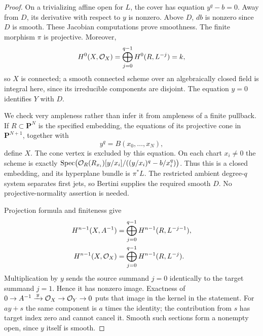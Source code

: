 \begin{proof}
On a trivializing affine open for $L$, the cover has equation
$y^q-b=0$. Away from $D$, its derivative with respect to $y$ is
nonzero. Above $D$, $db$ is nonzero since $D$ is smooth. These
Jacobian computations prove smoothness. The finite morphism $\pi$
is projective. Moreover,
\[
 H^0(X,\mathcal O_X)=\bigoplus_{j=0}^{q-1}H^0(R,L^{-j})=k,
\]
so $X$ is connected; a smooth connected scheme over an algebraically
closed field is integral here, since its irreducible components are
disjoint. The equation $y=0$ identifies $Y$ with $D$.

We check very ampleness rather than infer it from ampleness of a
finite pullback. If $R\subset\mathbf P^N$ is the specified
embedding, the equations of its projective cone in
$\mathbf P^{N+1}$, together with
\[
                 y^q=B(x_0,\ldots,x_N),
\]
define $X$. The cone vertex is excluded by this equation.
On each chart $x_i\ne0$ the scheme is exactly
$\operatorname{Spec}\bigl(\mathcal O_R(R_{x_i})
[y/x_i]/((y/x_i)^q-b/x_i^q)\bigr)$.
Thus this is a closed embedding, and its hyperplane bundle is
$\pi^*L$. The restricted ambient degree-$q$ system separates
first jets, so Bertini supplies the required smooth $D$.
No projective-normality assertion is needed.

Projection formula and finiteness give
\[
 \begin{split}
 H^{n-1}(X,A^{-1})&=\bigoplus_{j=0}^{q-1}
                         H^{n-1}(R,L^{-j-1}),\\
 H^{n-1}(X,\mathcal O_X)&=\bigoplus_{j=0}^{q-1}
                         H^{n-1}(R,L^{-j}).
 \end{split}
\]
Multiplication by $y$ sends the source summand $j=0$ identically
to the target summand $j=1$. Hence it has nonzero image.
Exactness of
$0\to A^{-1}\xrightarrow{\,y\,}\mathcal O_X\to\mathcal O_Y\to0$
puts that image in the kernel in the statement. For $a y+s$ the
same component is $a$ times the identity; the contribution from
$s$ has target index zero and cannot cancel it. Smooth such
sections form a nonempty open, since $y$ itself is smooth.
\end{proof}


